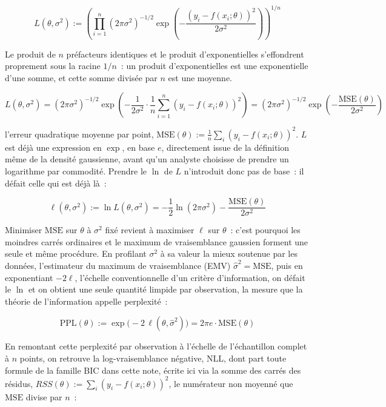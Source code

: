 \documentclass[11pt]{article}
\begin{document}
\begin{equation}
L(\theta,\sigma^2) := \left(\prod_{i=1}^n (2\pi\sigma^2)^{-1/2}
\exp\!\left(-\frac{(y_i - f(x_i;\theta))^2}{2\sigma^2}\right)\right)^{1/n}
\end{equation}

Le produit de $n$ préfacteurs identiques et le produit d'exponentielles
s'effondrent proprement sous la racine $1/n$~: un produit d'exponentielles
est une exponentielle d'une somme, et cette somme divisée par $n$ est une
moyenne.

\begin{equation}
L(\theta,\sigma^2) = (2\pi\sigma^2)^{-1/2}
\exp\!\left(-\frac{1}{2\sigma^2}\cdot\frac{1}{n}\sum_{i=1}^n (y_i - f(x_i;\theta))^2\right)
= (2\pi\sigma^2)^{-1/2}\exp\!\left(-\frac{\mathrm{MSE}(\theta)}{2\sigma^2}\right)
\end{equation}

l'erreur quadratique moyenne par point, $\mathrm{MSE}(\theta) :=
\frac{1}{n}\sum_i (y_i - f(x_i;\theta))^2$. $L$
est déjà une expression en $\exp$, en base $e$, directement issue de la
définition même de la densité gaussienne, avant qu'un analyste choisisse
de prendre un logarithme par commodité. Prendre le $\ln$ de $L$
n'introduit donc pas de base~: il défait celle qui est déjà là~:

\begin{equation}
\ell(\theta,\sigma^2) := \ln L(\theta,\sigma^2)
= -\frac{1}{2}\ln(2\pi\sigma^2) - \frac{\mathrm{MSE}(\theta)}{2\sigma^2}
\end{equation}

Minimiser $\mathrm{MSE}$ sur $\theta$ à $\sigma^2$ fixé revient à
maximiser $\ell$ sur $\theta$~: c'est pourquoi les moindres carrés
ordinaires et le maximum de vraisemblance gaussien forment une seule et
même procédure. En profilant $\sigma^2$ à sa valeur la mieux soutenue par
les données, l'estimateur du maximum de vraisemblance (EMV) $\hat\sigma^2
= \mathrm{MSE}$, puis en exponentiant $-2\ell$, l'échelle conventionnelle
d'un critère d'information, on défait le $\ln$ et on obtient une seule
quantité limpide par observation, la mesure que la théorie de
l'information appelle perplexité~:

\begin{equation}
\mathrm{PPL}(\theta) := \exp\!\big(-2\,\ell(\theta,\hat\sigma^2)\big) = 2\pi e \cdot \mathrm{MSE}(\theta)
\end{equation}

En remontant cette perplexité par observation à l'échelle de
l'échantillon complet à $n$ points, on retrouve la log-vraisemblance
négative, $\mathrm{NLL}$, dont part toute formule de la famille
$\mathrm{BIC}$ dans cette note, écrite ici via la somme des carrés des
résidus, $RSS(\theta) := \sum_i (y_i - f(x_i;\theta))^2$, le numérateur
non moyenné que $\mathrm{MSE}$ divise par $n$~:
\end{document}
